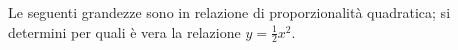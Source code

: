 Le seguenti grandezze sono in relazione di proporzionalità quadratica; 
si determini per quali è vera la relazione
$\displaystyle y = \frac{1}{2} x^2$.